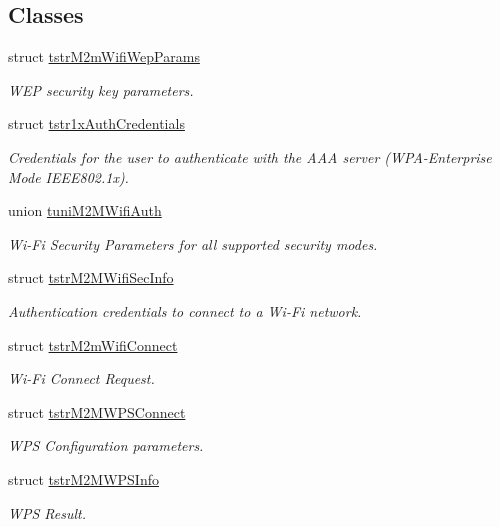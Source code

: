 \subsection*{Classes}
\begin{DoxyCompactItemize}
\item 
struct \hyperlink{structtstrM2mWifiWepParams}{tstr\+M2m\+Wifi\+Wep\+Params}
\begin{DoxyCompactList}\small\item\em W\+EP security key parameters. \end{DoxyCompactList}\item 
struct \hyperlink{structtstr1xAuthCredentials}{tstr1x\+Auth\+Credentials}
\begin{DoxyCompactList}\small\item\em Credentials for the user to authenticate with the A\+AA server (W\+P\+A-\/\+Enterprise Mode I\+E\+E\+E802.\+1x). \end{DoxyCompactList}\item 
union \hyperlink{uniontuniM2MWifiAuth}{tuni\+M2\+M\+Wifi\+Auth}
\begin{DoxyCompactList}\small\item\em Wi-\/\+Fi Security Parameters for all supported security modes. \end{DoxyCompactList}\item 
struct \hyperlink{structtstrM2MWifiSecInfo}{tstr\+M2\+M\+Wifi\+Sec\+Info}
\begin{DoxyCompactList}\small\item\em Authentication credentials to connect to a Wi-\/\+Fi network. \end{DoxyCompactList}\item 
struct \hyperlink{structtstrM2mWifiConnect}{tstr\+M2m\+Wifi\+Connect}
\begin{DoxyCompactList}\small\item\em Wi-\/\+Fi Connect Request. \end{DoxyCompactList}\item 
struct \hyperlink{structtstrM2MWPSConnect}{tstr\+M2\+M\+W\+P\+S\+Connect}
\begin{DoxyCompactList}\small\item\em W\+PS Configuration parameters. \end{DoxyCompactList}\item 
struct \hyperlink{structtstrM2MWPSInfo}{tstr\+M2\+M\+W\+P\+S\+Info}
\begin{DoxyCompactList}\small\item\em W\+PS Result. \end{DoxyCompactList}\item 

\end{DoxyCompactItemize}
